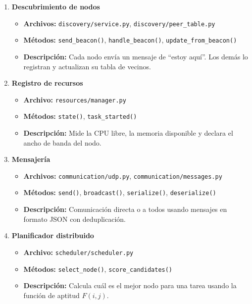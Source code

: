 \documentclass{article}
\begin{document}
\begin{enumerate}
    \item \textbf{Descubrimiento de nodos}
    \begin{itemize}
        \item \textbf{Archivos:} \texttt{discovery/service.py}, \texttt{discovery/peer\_table.py}
        \item \textbf{Métodos:} \texttt{send\_beacon()}, \texttt{handle\_beacon()}, \texttt{update\_from\_beacon()}
        \item \textbf{Descripción:} Cada nodo envía un mensaje de ``estoy aquí''. Los demás lo registran y actualizan su tabla de vecinos.
    \end{itemize}

    \item \textbf{Registro de recursos}
    \begin{itemize}
        \item \textbf{Archivo:} \texttt{resources/manager.py}
        \item \textbf{Métodos:} \texttt{state()}, \texttt{task\_started()}
        \item \textbf{Descripción:} Mide la CPU libre, la memoria disponible y declara el ancho de banda del nodo.
    \end{itemize}

    \item \textbf{Mensajería}
    \begin{itemize}
        \item \textbf{Archivos:} \texttt{communication/udp.py}, \texttt{communication/messages.py}
        \item \textbf{Métodos:} \texttt{send()}, \texttt{broadcast()}, \texttt{serialize()}, \texttt{deserialize()}
        \item \textbf{Descripción:} Comunicación directa o a todos usando mensajes en formato JSON con deduplicación.
    \end{itemize}

    \item \textbf{Planificador distribuido}
    \begin{itemize}
        \item \textbf{Archivo:} \texttt{scheduler/scheduler.py}
        \item \textbf{Métodos:} \texttt{select\_node()}, \texttt{score\_candidates()}
        \item \textbf{Descripción:} Calcula cuál es el mejor nodo para una tarea usando la función de aptitud \(F(i,j)\).
    \end{itemize}


\end{enumerate}
\end{document}
